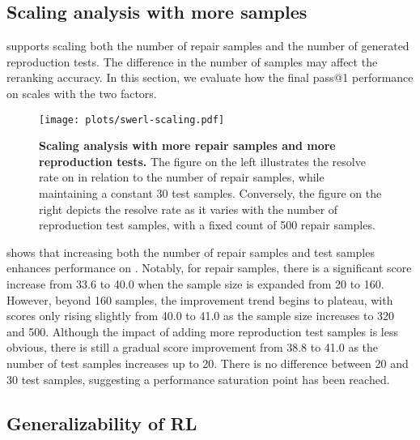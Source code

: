 \subsection{Scaling analysis with more samples}
\label{subsec:scaling}
\ouragentless supports scaling both the number of repair samples and the number of generated reproduction tests.
The difference in the number of samples may affect the reranking accuracy.
In this section, we evaluate how the final pass@1 performance on \swebverified scales with the two factors.

\begin{figure}[htb!]
\centering
\texttt{[image: plots/swerl-scaling.pdf]}
\caption{\textbf{Scaling analysis with more repair samples and more reproduction tests.}
The figure on the left illustrates the resolve rate on \swebverified in relation to the number of repair samples, while maintaining a constant 30 test samples.
Conversely, the figure on the right depicts the resolve rate as it varies with the number of reproduction test samples, with a fixed count of 500 repair samples.
}
\label{fig:scaling}
\end{figure}

 shows that increasing both the number of repair samples and test samples enhances performance on \swebench.
Notably, for repair samples, there is a significant score increase from 33.6 to 40.0 when the sample size is expanded from 20 to 160. However, beyond 160 samples, the improvement trend begins to plateau, with scores only rising slightly from 40.0 to 41.0 as the sample size increases to 320 and 500.
Although the impact of adding more reproduction test samples is less obvious,
there is still a gradual score improvement from 38.8 to 41.0 as the number of test samples increases up to 20.
There is no difference between 20 and 30 test samples, suggesting a performance saturation point has been reached.

\subsection{Generalizability of RL}
\label{subsec:generalizability}


